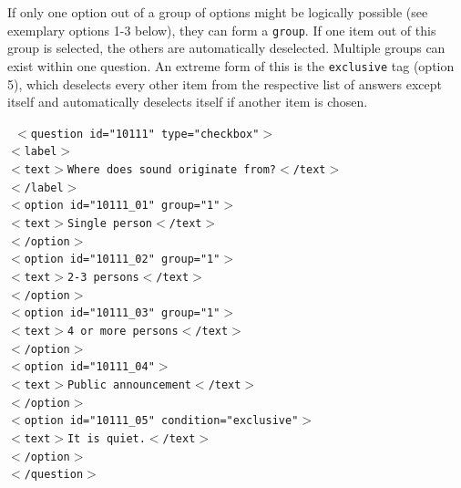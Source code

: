 \documentclass[11pt,a4paper,titlepage]{article}
\begin{document}
If only one option out of a group of options might be logically possible (see exemplary options 1-3 below), they can form a \texttt{group}. If one item out of this group is selected, the others are automatically deselected. Multiple groups can exist within one question. An extreme form of this is the \texttt{exclusive} tag (option 5), which deselects every other item from the respective list of answers except itself and automatically deselects itself if another item is chosen.
%
\begin{center}
\begin{tcolorbox}[colback=black!10!white,colframe=black!50!white]
\texttt{
$<$question id="10111" type="checkbox"$>$\\
\hspace*{0.5cm}$<$label$>$\\
\hspace*{1cm}$<$text$>$Where does sound originate from?$<$/text$>$\\
\hspace*{0.5cm}$<$/label$>$\\
\hspace*{0.5cm}$<$option id="10111\_01" group="1"$>$\\
\hspace*{1cm}$<$text$>$Single person$<$/text$>$\\
\hspace*{0.5cm}$<$/option$>$\\
\hspace*{0.5cm}$<$option id="10111\_02" group="1"$>$\\
\hspace*{1cm}$<$text$>$2-3 persons$<$/text$>$\\
\hspace*{0.5cm}$<$/option$>$\\
\hspace*{0.5cm}$<$option id="10111\_03" group="1"$>$\\
\hspace*{1cm}$<$text$>$4 or more persons$<$/text$>$\\
\hspace*{0.5cm}$<$/option$>$\\
\hspace*{0.5cm}$<$option id="10111\_04"$>$\\
\hspace*{1cm}$<$text$>$Public announcement$<$/text$>$\\
\hspace*{0.5cm}$<$/option$>$\\
\hspace*{0.5cm}$<$option id="10111\_05" condition="exclusive"$>$\\
\hspace*{1cm}$<$text$>$It is quiet.$<$/text$>$\\
\hspace*{0.5cm}$<$/option$>$\\
$<$/question$>$}
\end{tcolorbox}
\end{center}
\end{document}
